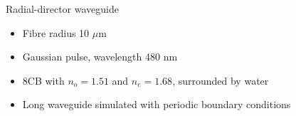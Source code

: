 \documentclass{beamer}
\newlength{\wideitemsep}
\let\olditem\item
\renewcommand{\item}{\setlength{\itemsep}{\wideitemsep}\olditem}
\begin{document}
\begin{frame}{Radial-director waveguide}
\begin{block}{}
  \vspace{-20pt}
  \begin{figure}[h]
\centering
{}
\end{figure}
\end{block}

\begin{block}{}
\begin{itemize}
  \item Fibre radius 10 $\mu$m
  \item Gaussian pulse, wavelength 480 nm
  \item 8CB with $n_o = 1.51$ and $n_e = 1.68$, surrounded by water
  \item Long waveguide simulated with periodic boundary conditions
\end{itemize}
\end{block}

\end{frame}
  
\end{document}
